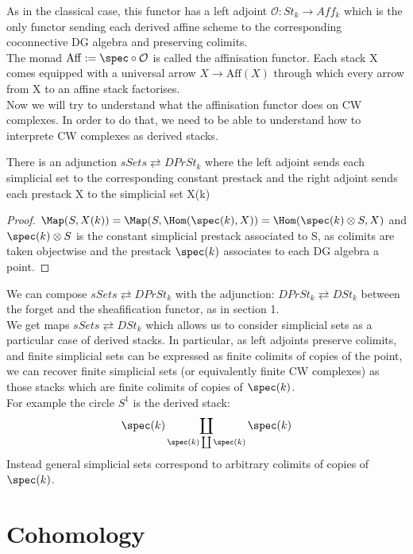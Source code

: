 As in the classical case, this functor has a left adjoint $\mathcal O: St_k \to Aff_k$ which is the only functor sending each derived affine scheme to the corresponding coconnective
DG algebra and preserving colimits.\\
The monad $\mathrm{Aff}:= \spec\circ\mathcal O$ is called the affinisation functor. Each stack X comes equipped with a universal arrow $X\to\mathrm{Aff}(X)$ through which every arrow
from X to an affine stack factorises.\\

Now we will try to understand what the affinisation functor does on CW complexes. In order to do that, we need to be able to understand how to interprete
CW complexes as derived stacks.\\
\begin{prop}
There is an adjunction $sSets \rightleftarrows DPrSt_k$ where the left adjoint sends each simplicial set 
to the corresponding constant prestack and the right adjoint sends each prestack X to the simplicial set X(k)
\end{prop}

\begin{proof}
$\Map(S,X(k))=\Map(S,\Hom(\spec(k), X))=\Hom(\spec(k)\otimes S, X)$ and $\spec(k)\otimes S$ is the constant simplicial prestack associated to S, as colimits are taken objectwise
and the prestack $\spec(k)$ associates to each DG algebra a point.
\end{proof}

We can compose $sSets \rightleftarrows DPrSt_k$ with the adjunction: $DPrSt_k\rightleftarrows DSt_k$ between the forget and the sheafification functor, as in section 1.\\
We get maps $sSets \rightleftarrows DSt_k$ which allows us to consider simplicial sets as a particular case of derived stacks.
In particular, as left adjoints preserve colimits, and finite simplicial
sets can be expressed as finite colimits of copies of the point, we can recover finite simplicial sets (or equivalently finite CW complexes) as those stacks 
which are finite colimits of copies
of $\spec(k)$.\\
For example the circle $S^1$ is the derived stack:
$$\spec(k)\coprod_{\spec(k)\coprod \spec(k)}\spec(k)$$
Instead general simplicial sets correspond to arbitrary colimits of copies of $\spec(k)$.\\


\section{Cohomology}

